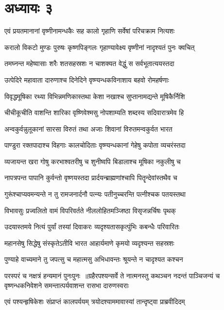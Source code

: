 \chapter{अध्यायः ३}
\twolineshloka
{एवं प्रयतमानानां वृष्णीनामन्धकैः सह}
{कालो गृहाणि सर्वेषां परिचक्राम नित्यशः}


\twolineshloka
{करालो विकटो मुण्डः पुरुषः कृष्णपिङ्गलः}
{गृहाण्यावेक्ष्य वृष्णीनां नादृश्यतं पुनः क्वचित्}


\twolineshloka
{तमघ्नन्त महेष्वासाः शरैः शतसहस्रशः}
{न चाशक्यत वेद्धुं स सर्वभूतात्ययस्तदा}


\twolineshloka
{उत्पेदिरे महावाता दारुणाश्च दिनेदिने}
{वृष्ण्यन्धकविनाशाय बहवो रोमहर्षणाः}


\twolineshloka
{विवृद्धमूषिका रथ्या विभिन्नमणिकास्तथा}
{केशा नखाश्च सुप्तानामद्यन्ते मूषिकैर्निशि}


\twolineshloka
{चीचीकूचीति वाशन्ति शारिका वृष्णिवेश्मसु}
{नोपशाम्यति शब्दस्य सदिवारात्रमेव हि}


\twolineshloka
{अन्वकुर्वन्नुलूकानां सारसा विरुतं तथा}
{अजाः शिवानां विरुतमन्वकुर्वत भारत}


\twolineshloka
{पाण्डुरा रक्तपादाश्च विहगाः कालचोदिताः}
{वृष्ण्यन्धकानां गेहेषु कपोता व्यचरंस्तदा}


\twolineshloka
{व्यजायन्त खरा गोषु करभाश्वतरीषु च}
{शुनीष्वपि बिडालाश्च मूषिका नकुलीषु च}


\twolineshloka
{नापत्रपन्त पापानि कुर्वन्तो वृष्णयस्तदा}
{प्रार्दयन्ब्राह्मणांश्चापि पितॄन्देवांस्तथैव च}


\twolineshloka
{गुरूंश्चाप्यवमन्यन्ते न तु रामजनार्दनौ}
{पत्न्यः पतीनुच्चरन्ति पत्नीश्चक पतयस्तथा}


\twolineshloka
{विभावसुः प्रज्वलितो वामं विपरिवर्तते}
{नीललोहितमञ्जिष्ठा विसृजन्नर्चिषः पृथक्}


\twolineshloka
{उदयास्तमये नित्यं पुर्यां तस्यां दिवाकरः}
{व्यदृश्यतासकृत्पुंभिः कबन्धैः परिवारितः}


\twolineshloka
{महानसेषु सिद्धेषु संस्कृतेऽतीवि भारत}
{आहार्यमाणे कृमयो व्यदृश्यन्त सहस्रशः}


\twolineshloka
{पुण्याहे वाच्यमाने तु जपत्सु च महात्मसु}
{अभिधावन्तः श्रूयन्ते न चादृश्यत कश्चन}


परस्परं च नक्षत्रं हन्यमानं पुनःपुनः ॥ग्रहैरपश्यन्सर्वे ते नात्मनस्तु कथञ्चन
\twolineshloka
{नदन्तं पाञ्चिजन्यं च वृष्णन्धकनिवेशने}
{समन्तात्पर्यवाशन्त रासभा दारुणस्वराः}


\twolineshloka
{एवं पश्यन्हृषिकेशः संप्राप्तं कालपर्ययम्}
{त्रयोदश्याममावास्यां तान्दृष्ट्वा प्राब्रवीदिदम्}


